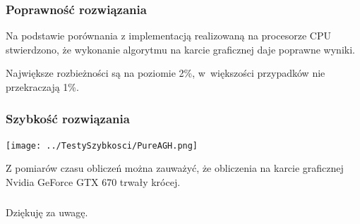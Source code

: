 \begin{frame}
	\frametitle{Poprawność rozwiązania}

	Na podstawie porównania z implementacją realizowaną na procesorze CPU stwierdzono, że wykonanie algorytmu na karcie graficznej daje poprawne wyniki.

	Największe rozbieżności są na poziomie 2\%, w~większości przypadków nie przekraczają 1\%.


\end{frame}
\begin{frame}
	\frametitle{Szybkość rozwiązania}

	\begin{center}
		\texttt{[image: ../TestySzybkosci/PureAGH.png]}
	\end{center}
\tiny{Z pomiarów czasu obliczeń można zauważyć, że obliczenia na karcie graficznej Nvidia GeForce GTX 670 trwały krócej.}

\end{frame}

\begin{frame}
	\frametitle{}
	\begin{center}
		Dziękuję za uwagę.
	\end{center}
\end{frame}
